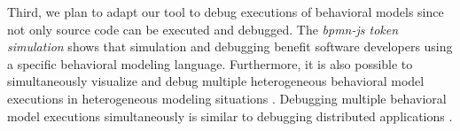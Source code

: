 \documentclass[conference]{IEEEtran}
\begin{document}
Third, we plan to adapt our tool to debug executions of behavioral models since not only source code can be executed and debugged.
The \textit{bpmn-js token simulation} shows that simulation and debugging benefit software developers using a specific behavioral modeling language.
Furthermore, it is also possible to simultaneously visualize and debug multiple heterogeneous behavioral model executions in heterogeneous modeling situations \cite{krauterBehavioralConsistencyHeterogeneous2021}.
Debugging multiple behavioral model executions simultaneously is similar to debugging distributed applications \cite{kochGraphicalDebuggingDistributed2015}.


\end{document}
